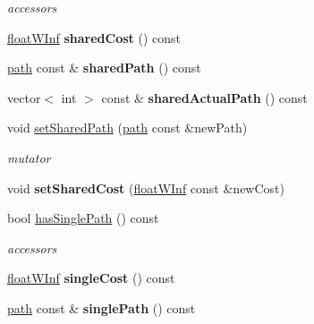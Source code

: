 \begin{DoxyCompactItemize}
\begin{DoxyCompactList}\small\item\em accessors \end{DoxyCompactList}\item 
\hypertarget{classjourney_a41d07921b1ea9a72bad73c6be7e45531}{
\hyperlink{classfloatWInf}{floatWInf} {\bfseries sharedCost} () const }
\label{classjourney_a41d07921b1ea9a72bad73c6be7e45531}

\item 
\hypertarget{classjourney_a6ebde1fd2f0d1a6f9bcbfd066f0ed5d3}{
\hyperlink{classpath}{path} const \& {\bfseries sharedPath} () const }
\label{classjourney_a6ebde1fd2f0d1a6f9bcbfd066f0ed5d3}

\item 
\hypertarget{classjourney_abf73869294444564e56d652301fccb0f}{
vector$<$ int $>$ const \& {\bfseries sharedActualPath} () const }
\label{classjourney_abf73869294444564e56d652301fccb0f}

\item 
\hypertarget{classjourney_a46c861929c34d91eeec58916870103d7}{
void \hyperlink{classjourney_a46c861929c34d91eeec58916870103d7}{setSharedPath} (\hyperlink{classpath}{path} const \&newPath)}
\label{classjourney_a46c861929c34d91eeec58916870103d7}

\begin{DoxyCompactList}\small\item\em mutator \end{DoxyCompactList}\item 
\hypertarget{classjourney_ad98a6f40be206a4d2787917a4ebab160}{
void {\bfseries setSharedCost} (\hyperlink{classfloatWInf}{floatWInf} const \&newCost)}
\label{classjourney_ad98a6f40be206a4d2787917a4ebab160}

\item 
\hypertarget{classjourney_af40c33eb0a9075e822901bde89779296}{
bool \hyperlink{classjourney_af40c33eb0a9075e822901bde89779296}{hasSinglePath} () const }
\label{classjourney_af40c33eb0a9075e822901bde89779296}

\begin{DoxyCompactList}\small\item\em accessors \end{DoxyCompactList}\item 
\hypertarget{classjourney_a4f65b3e7562f04a235dec0b939a0a7b5}{
\hyperlink{classfloatWInf}{floatWInf} {\bfseries singleCost} () const }
\label{classjourney_a4f65b3e7562f04a235dec0b939a0a7b5}

\item 
\hypertarget{classjourney_a7b1526de98876067ed112dbfc3eaa8cc}{
\hyperlink{classpath}{path} const \& {\bfseries singlePath} () const }
\label{classjourney_a7b1526de98876067ed112dbfc3eaa8cc}


\end{DoxyCompactItemize}
